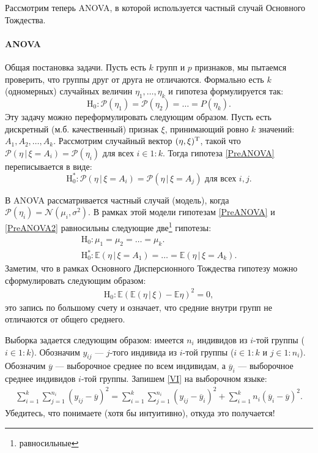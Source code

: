 Рассмотрим теперь ANOVA, в которой используется частный случай Основного Тождества.
\paragraph{ANOVA}
Общая постановка задачи.
Пусть есть $k$ групп и $p$ признаков, мы пытаемся проверить, что группы друг от друга не отличаются.
Формально есть $k$ (одномерных) случайных величин $\eta_1, \ldots, \eta_k$ и гипотеза формулируется так:
\begin{equation}
    \label{PreANOVA}
    \mathrm H_0: \mathcal P(\eta_1) = \mathcal P(\eta_2) = \ldots \mathcal =P(\eta_k).
\end{equation}
Эту задачу можно переформулировать следующим образом.
Пусть есть дискретный (м.б. качественный) признак $\xi$, принимающий ровно $k$ значений: $A_1, A_2, \ldots, A_k$.
Рассмотрим случайный вектор $(\eta, \xi)^{\mathrm{T}}$, такой что $\mathcal P(\eta \, | \, \xi = A_i) = \mathcal P(\eta_i)$ для всех $i \in 1:k$.
Тогда гипотеза \eqref{PreANOVA} переписывается в виде:
\begin{equation}
    \label{PreANOVA2}
    \mathrm H_0^*: \mathcal P(\eta \, | \, \xi = A_i) = \mathcal P(\eta \, | \, \xi = A_j) \text{ для всех $i, j$}.
\end{equation}

В ANOVA рассматривается частный случай (модель), когда $\mathcal P(\eta_i) = \mathcal N(\mu_i, \sigma^2)$.
В рамках этой модели гипотезам \eqref{PreANOVA} и \eqref{PreANOVA2} равносильны следующие две\footnote{равносильные} гипотезы:
\begin{gather}
    \label{ANOVA}
    \mathrm H_0: \mu_1 = \mu_2 = \ldots = \mu_k.\\
    \mathrm H_0^*: \mathbb E (\eta \, | \, \xi = A_1) = \ldots = \mathbb E (\eta \, | \, \xi = A_k).
\end{gather}
Заметим, что в рамках Основного Дисперсионного Тождества гипотезу можно сформулировать следующим образом:
\begin{gather}
    \label{ANOVA_VI_H}
    \mathrm H_0: \mathbb E(\mathbb E(\eta\, | \, \xi) - \mathbb E \eta)^2 = 0,
\end{gather}
это запись по большому счету и означает, что средние внутри групп не отличаются от общего среднего.

Выборка задается следующим образом: имеется $n_i$ индивидов из $i$-той группы ($i \in 1:k$).
Обозначим $y_{ij}$ --- $j$-того индивида из $i$-той группы ($i \in 1:k$ и $j \in 1:n_i$).
Обозначим $\overline y$ --- выборочное среднее по всем индивидам, а $\overline y_i$ --- выборочное среднее индивидов $i$-той группы.
Запишем \eqref{VI} на выборочном языке:
\begin{gather}
    \label{VI_ANOVA}
    \sum_{i=1}^k \sum_{j=1}^{n_i} (y_{ij} - \overline y)^2 = \sum_{i=1}^k \sum_{j=1}^{n_i} (y_{ij} - \overline y_i)^2 + \sum_{i=1}^k n_i (\overline y_i - \overline y)^2.
\end{gather}
Убедитесь, что понимаете (хотя бы интуитивно), откуда это получается!

